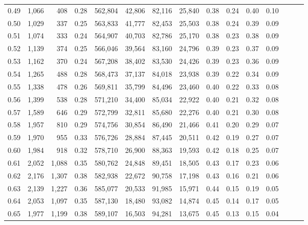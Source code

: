 \begin{tabular}{rrrrrrrrrrrrrrr}
0.49 &   1,066 &    408 &  0.28 &  562,804 &   42,806 &   82,116 &   25,840 &  0.38 &  0.24 &  0.40 &      0.10 \\
0.50 &   1,029 &    337 &  0.25 &  563,833 &   41,777 &   82,453 &   25,503 &  0.38 &  0.24 &  0.39 &      0.09 \\
0.51 &   1,074 &    333 &  0.24 &  564,907 &   40,703 &   82,786 &   25,170 &  0.38 &  0.23 &  0.38 &      0.09 \\
0.52 &   1,139 &    374 &  0.25 &  566,046 &   39,564 &   83,160 &   24,796 &  0.39 &  0.23 &  0.37 &      0.09 \\
0.53 &   1,162 &    370 &  0.24 &  567,208 &   38,402 &   83,530 &   24,426 &  0.39 &  0.23 &  0.36 &      0.09 \\
0.54 &   1,265 &    488 &  0.28 &  568,473 &   37,137 &   84,018 &   23,938 &  0.39 &  0.22 &  0.34 &      0.09 \\
0.55 &   1,338 &    478 &  0.26 &  569,811 &   35,799 &   84,496 &   23,460 &  0.40 &  0.22 &  0.33 &      0.08 \\
0.56 &   1,399 &    538 &  0.28 &  571,210 &   34,400 &   85,034 &   22,922 &  0.40 &  0.21 &  0.32 &      0.08 \\
0.57 &   1,589 &    646 &  0.29 &  572,799 &   32,811 &   85,680 &   22,276 &  0.40 &  0.21 &  0.30 &      0.08 \\
0.58 &   1,957 &    810 &  0.29 &  574,756 &   30,854 &   86,490 &   21,466 &  0.41 &  0.20 &  0.29 &      0.07 \\
0.59 &   1,970 &    955 &  0.33 &  576,726 &   28,884 &   87,445 &   20,511 &  0.42 &  0.19 &  0.27 &      0.07 \\
0.60 &   1,984 &    918 &  0.32 &  578,710 &   26,900 &   88,363 &   19,593 &  0.42 &  0.18 &  0.25 &      0.07 \\
0.61 &   2,052 &  1,088 &  0.35 &  580,762 &   24,848 &   89,451 &   18,505 &  0.43 &  0.17 &  0.23 &      0.06 \\
0.62 &   2,176 &  1,307 &  0.38 &  582,938 &   22,672 &   90,758 &   17,198 &  0.43 &  0.16 &  0.21 &      0.06 \\
0.63 &   2,139 &  1,227 &  0.36 &  585,077 &   20,533 &   91,985 &   15,971 &  0.44 &  0.15 &  0.19 &      0.05 \\
0.64 &   2,053 &  1,097 &  0.35 &  587,130 &   18,480 &   93,082 &   14,874 &  0.45 &  0.14 &  0.17 &      0.05 \\
0.65 &   1,977 &  1,199 &  0.38 &  589,107 &   16,503 &   94,281 &   13,675 &  0.45 &  0.13 &  0.15 &      0.04 \\

\end{tabular}
